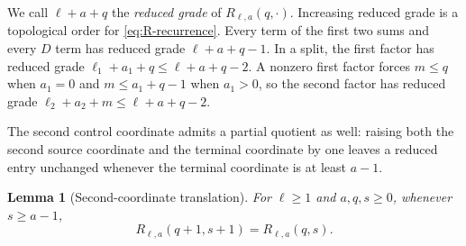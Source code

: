 \documentclass[11pt,reqno]{amsart}
\newtheorem{lemma}[lemma]{Lemma}
\theoremstyle{definition}
\theoremstyle{remark}
\begin{document}
We call $\ell+a+q$ the \emph{reduced grade} of $R_{\ell,a}(q,\mathord\cdot)$.
Increasing reduced grade is a topological order for
\eqref{eq:R-recurrence}.  Every term of the first two sums and every $D$
term has reduced grade $\ell+a+q-1$.  In a split, the first factor has
reduced grade $\ell_1+a_1+q\leq\ell+a+q-2$.  A nonzero first factor forces
$m\leq q$ when $a_1=0$ and $m\leq a_1+q-1$ when $a_1>0$, so the second
factor has reduced grade $\ell_2+a_2+m\leq\ell+a+q-2$.

The second control coordinate admits a partial quotient as well: raising
both the second source coordinate and the terminal coordinate by one leaves
a reduced entry unchanged whenever the terminal coordinate is at least
$a-1$.

\begin{lemma}[Second-coordinate translation]\label{lem:d2-second-translation}
For $\ell\geq1$ and $a,q,s\geq0$, whenever $s\geq a-1$,
\begin{equation}\label{eq:d2-second-translation}
 R_{\ell,a}(q+1,s+1)=R_{\ell,a}(q,s).
\end{equation}
\end{lemma}
\end{document}
